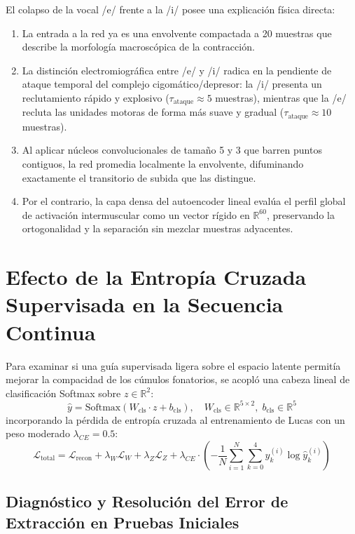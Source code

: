 \documentclass[11pt,a4paper]{article}
\begin{document}
El colapso de la vocal /e/ frente a la /i/ posee una explicación física directa:
\begin{enumerate}
    \item La entrada a la red ya es una envolvente compactada a 20 muestras que describe la morfología macroscópica de la contracción.
    \item La distinción electromiográfica entre /e/ y /i/ radica en la pendiente de ataque temporal del complejo cigomático/depresor: la /i/ presenta un reclutamiento rápido y explosivo ($\tau_{\text{ataque}} \approx 5$ muestras), mientras que la /e/ recluta las unidades motoras de forma más suave y gradual ($\tau_{\text{ataque}} \approx 10$ muestras).
    \item Al aplicar núcleos convolucionales de tamaño 5 y 3 que barren puntos contiguos, la red promedia localmente la envolvente, difuminando exactamente el transitorio de subida que las distingue.
    \item Por el contrario, la capa densa del autoencoder lineal evalúa el perfil global de activación intermuscular como un vector rígido en $\mathbb{R}^{60}$, preservando la ortogonalidad y la separación sin mezclar muestras adyacentes.
\end{enumerate}

\section{Efecto de la Entropía Cruzada Supervisada en la Secuencia Continua}
\label{sec:entropia_cruzada}

Para examinar si una guía supervisada ligera sobre el espacio latente permitía mejorar la compacidad de los cúmulos fonatorios, se acopló una cabeza lineal de clasificación Softmax sobre $z \in \mathbb{R}^2$:
\begin{equation}
    \hat{y} = \text{Softmax}(W_{\text{cls}} \cdot z + b_{\text{cls}}), \quad W_{\text{cls}} \in \mathbb{R}^{5 \times 2}, \; b_{\text{cls}} \in \mathbb{R}^5
\end{equation}
incorporando la pérdida de entropía cruzada al entrenamiento de Lucas con un peso moderado $\lambda_{CE} = 0.5$:
\begin{equation}
    \mathcal{L}_{\text{total}} = \mathcal{L}_{\text{recon}} + \lambda_W \mathcal{L}_W + \lambda_Z \mathcal{L}_Z + \lambda_{CE} \cdot \left( -\frac{1}{N} \sum_{i=1}^N \sum_{k=0}^4 y_k^{(i)} \log \hat{y}_k^{(i)} \right)
\end{equation}

\subsection{Diagnóstico y Resolución del Error de Extracción en Pruebas Iniciales}
\label{subsec:error_extraccion}
\end{document}
